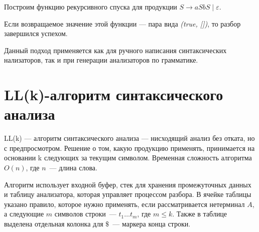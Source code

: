 \begin{example}

Построим функцию рекурсивного спуска для продукции $S \rightarrow aSbS \mid \varepsilon$.

\begin{algorithm}


\end{algorithm}
\end{example}

Если возвращаемое значение этой функции --- пара вида \textit{(true, [])}, то разбор завершился успехом.

Данный подход применяется как для ручного написания синтаксических нализаторов, так и при генерации анализаторов по грамматике.

\section{LL(k)-алгоритм синтаксического анализа}

LL(k) --- алгоритм синтаксического анализа --- нисходящий анализ без отката, но с предпросмотром.
Решение о том, какую продукцию применять, принимается на основании k следующих за текущим символом.
Временная сложность алгоритма $O(n)$, где $n$~--- длина слова.

Алгоритм использует входной буфер, стек для хранения промежуточных данных и таблицу анализатора, которая управляет процессом разбора.
В ячейке таблицы указано правило, которое нужно применять, если рассматривается нетерминал $A$, а следующие $m$ символов строки~--- $t_{1} \dots t_{m}$, где $m \leq k$.
Также в таблице выделена отдельная колонка для $\$$~--- маркера конца строки.

